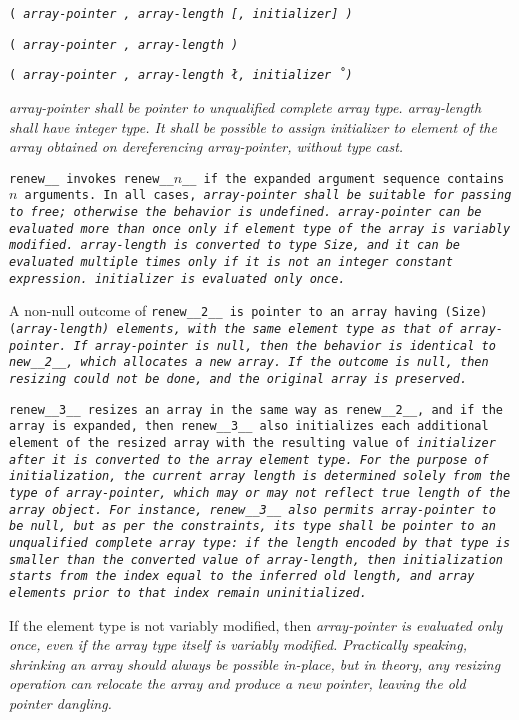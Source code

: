 
\s\s\s\s\tt{(} \it{array-pointer} \tt{,} \it{array-length}
[\tt{,} \it{initializer}] \tt{)}

\s\tt{(} \it{array-pointer} \tt{,} \it{array-length} \tt{)}

\s\tt{(} \it{array-pointer} \tt{,} \it{array-length}
\l\tt{,} \it{initializer}\r\ \tt{)}


\it{array-pointer} shall be pointer to unqualified complete array type.
\it{array-length} shall have integer type.
It shall be possible to assign \it{initializer} to element of the
array obtained on dereferencing \it{array-pointer}, without type cast.


\tt{renew__} invokes \tt{renew__}$n$\_\_ if the
expanded argument sequence contains $n$ arguments.
In all cases, \it{array-pointer} shall be suitable for passing to \tt{free};
otherwise the behavior is undefined.
\it{array-pointer} can be evaluated more than once
only if element type of the array is variably modified.
\it{array-length} is converted to type \tt{Size}, and it can be evaluated
multiple times only if it is not an integer constant expression.
\it{initializer} is evaluated only once.

A non-null outcome of \tt{renew__2__} is pointer to an
array having \tt{(Size)(}\it{array-length}\tt{)} elements,
with the same element type as that of \it{array-pointer}.
If \it{array-pointer} is null,
then the behavior is identical to \tt{new__2__}, which allocates a new array.
If the outcome is null,
then resizing could not be done, and the original array is preserved.

\tt{renew__3__} resizes an array in the same way as \tt{renew__2__},
and if the array is expanded, then \tt{renew__3__} also initializes
each additional element of the resized array with the resulting value
of \it{initializer} after it is converted to the array element type.
For the purpose of initialization, the current array length
is determined solely from the type of \it{array-pointer},
which may or may not reflect true length of the array object.
For instance, \tt{renew__3__} also permits \it{array-pointer} to be null, but as
per the constraints, its type shall be pointer to an unqualified complete array
type: if the length encoded by that type is smaller than the converted value of
\it{array-length}, then initialization starts from the index equal to the
inferred old length, and array elements prior to that index remain uninitialized.

\note If the element type is not variably modified, then \it{array-pointer}
is evaluated only once, even if the array type itself is variably modified.
Practically speaking, shrinking an array should always be possible in-place,
but in theory, any resizing operation can relocate the array
and produce a new pointer, leaving the old pointer dangling.
